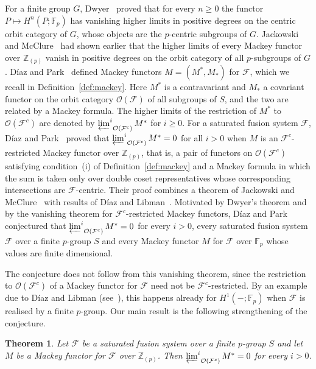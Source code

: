 \documentclass[10pt]{amsart}
\newtheorem{theorem}{Theorem}[section]
\theoremstyle{definition}
\numberwithin{equation}{section}
\renewcommand{\ge}{\geqslant}
\newcommand{\F}{\mathcal F}
\newcommand{\Op}{\mathcal O}
\newcommand{\limi}[2]{\mathop{\varprojlim\nolimits^{#1}}_{#2}}
\begin{document}
For a finite group $G$, Dwyer~\cite[Theorem~10.3]{Dwyer1998Sharp} proved that for every $n\ge0$ the functor ${P\mapsto H^n(P;\mathbb{F}_p)}$ has vanishing higher limits in positive degrees on the centric orbit category of $G$, whose objects are the $p$-centric subgroups of $G$. Jackowski and McClure~\cite[Proposition~5.14]{JM1992} had shown earlier that the higher limits of every Mackey functor over $\mathbb{Z}_{(p)}$ vanish in positive degrees on the orbit category of all $p$-subgroups of $G$. D\'iaz and Park~\cite{DP} defined Mackey functors $M=(M^*,M_*)$ for $\F$, which we recall in Definition~\ref{def:mackey}. Here $M^*$ is a contravariant and $M_*$ a covariant functor on the orbit category $\Op(\F)$ of all subgroups of $S$, and the two are related by a Mackey formula. The higher limits of the restriction of $M^*$ to $\Op(\F^c)$ are denoted by $\limi{i}{\Op(\F^c)}M^*$ for $i\ge0$. For a saturated fusion system $\F$, D\'iaz and Park~\cite[Theorem~A]{DP} proved that $\limi{i}{\Op(\F^c)}M^*=0$ for all $i>0$ when $M$ is an $\F^c$-restricted Mackey functor over $\mathbb{Z}_{(p)}$, that is, a pair of functors on $\Op(\F^c)$ satisfying condition~(i) of Definition~\ref{def:mackey} and a Mackey formula in which the sum is taken only over double coset representatives whose corresponding intersections are $\F$-centric. Their proof combines a theorem of Jackowski and McClure~\cite[Corollary~5.16]{JM1992} with results of D\'iaz and Libman~\cite[Proposition~2.9 and Remark~2.10]{DL2009}. Motivated by Dwyer's theorem and by the vanishing theorem for $\F^c$-restricted Mackey functors, D\'iaz and Park~\cite[Conjecture]{DP} conjectured that $\limi{i}{\Op(\F^c)}M^*=0$ for every $i>0$, every saturated fusion system $\F$ over a finite $p$-group $S$ and every Mackey functor $M$ for $\F$ over $\mathbb{F}_p$ whose values are finite dimensional.

The conjecture does not follow from this vanishing theorem, since the restriction to $\Op(\F^c)$ of a Mackey functor for $\F$ need not be $\F^c$-restricted. By an example due to D\'iaz and Libman (see~\cite[Example~5.4]{DP}), this happens already for $H^1(-;\mathbb{F}_p)$ when $\F$ is realised by a finite $p$-group. Our main result is the following strengthening of the conjecture.

\begin{theorem}\label{thm:main}
Let $\F$ be a saturated fusion system over a finite $p$-group $S$ and let $M$ be a Mackey functor for $\F$ over $\mathbb{Z}_{(p)}$. Then $\limi{i}{\Op(\F^c)}M^*=0$ for every $i>0$.
\end{theorem}
\end{document}
